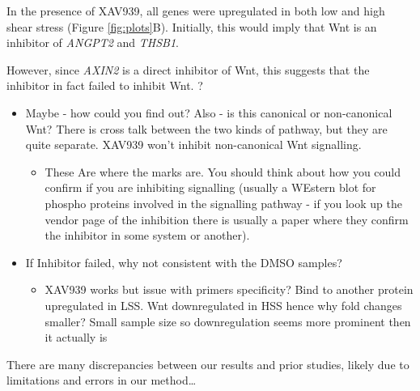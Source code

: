 \documentclass[
  11pt,
]{article}
\providecommand{\tightlist}{%
  \setlength{\itemsep}{0pt}\setlength{\parskip}{0pt}}
\begin{document}
\color{black}

In the presence of XAV939, all genes were upregulated in both low and high shear stress (Figure \ref{fig:plots}B).
Initially, this would imply that Wnt is an inhibitor of \emph{ANGPT2} and \emph{THSB1}.

However, since \emph{AXIN2} is a direct inhibitor of Wnt, this suggests that the inhibitor in fact failed to inhibit Wnt.
?

\color{red}

\begin{itemize}
\item
  Maybe - how could you find out?
  Also - is this canonical or non-canonical Wnt?
  There is cross talk between the two kinds of pathway, but they are quite separate.
  XAV939 won't inhibit non-canonical Wnt signalling.

  \begin{itemize}
  \tightlist
  \item
    These Are where the marks are. You should think about how you could confirm if you are inhibiting signalling (usually a WEstern blot for phospho proteins involved in the signalling pathway - if you look up the vendor page of the inhibition there is usually a paper where they confirm the inhibitor in some system or another).
  \end{itemize}
\item
  If Inhibitor failed, why not consistent with the DMSO samples?

  \begin{itemize}
  \tightlist
  \item
    XAV939 works but issue with primers specificity? Bind to another protein upregulated in LSS. Wnt downregulated in HSS hence why fold changes smaller? Small sample size so downregulation seems more prominent then it actually is
  \end{itemize}
\end{itemize}

\color{black}

There are many discrepancies between our results and prior studies, likely due to limitations and errors in our method\ldots{}

\color{red}
\end{document}
